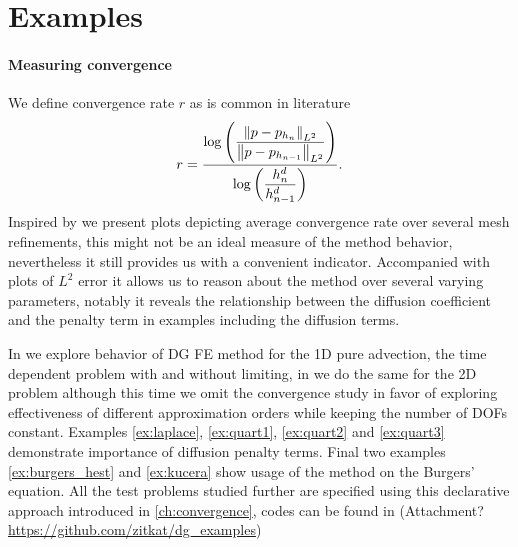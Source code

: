 \section{Examples}

\paragraph{Measuring convergence} We define convergence rate $r$ as is common
in literature
\begin{equation}
r = \frac{\log\left(\dfrac{\left\lVert p - p_{h_{n}}\right\rVert_{L^2}}{\left\lVert p - p_{h_{n-1}}\right\rVert_{L^2}}\right)}
{\log\left(\dfrac{h^d_{n}}{h^d_{n-1}}\right)}.
\end{equation}
Inspired by \cite{Kucera} we present plots depicting average convergence rate
over several mesh refinements, this might not be an ideal measure of the method
behavior, nevertheless it still provides us with a convenient indicator.
Accompanied with plots of $L^2$ error it allows us to reason about the method over
several varying parameters, notably it reveals the relationship between the diffusion
coefficient and the penalty term in examples including the diffusion terms.

In  we explore behavior of DG FE method for the 1D pure advection,
the time dependent problem with and without limiting, in  we do the same
for the 2D problem although this time we omit the convergence study in favor of exploring
effectiveness of different approximation orders while keeping the number of DOFs
constant. Examples \ref{ex:laplace}, \ref{ex:quart1}, \ref{ex:quart2} and \ref{ex:quart3}
demonstrate importance of diffusion penalty terms. Final two examples
\ref{ex:burgers_hest} and
\ref{ex:kucera} show usage of the method on the Burgers' equation. All the test problems
studied further are specified using this declarative approach introduced in
\ref{ch:convergence}, codes can be found in (\todo Attachment?
\url{https://github.com/zitkat/dg_examples})
